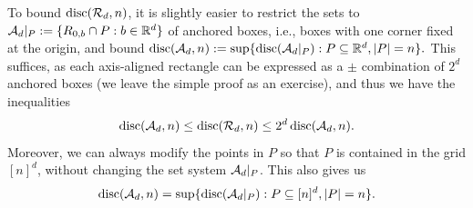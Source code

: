 To bound \(\disc(\RR_d, n)\), it is slightly easier to restrict the sets to 
\(
\AA_d|_P \eqdef \{\rbox_{0,b} \cap P: b \in \R^d\}
\)
of anchored boxes, i.e., boxes with one corner fixed at the origin, and bound
\(
\disc(\AA_d, n) \eqdef \sup\{\disc(\AA_d|_P): P \subseteq \R^d, |P| = n\}.
\)
This suffices, as each axis-aligned rectangle can be expressed as a $\pm$ combination of $2^d$ anchored boxes (we leave the simple proof as an exercise), and thus
  we have the inequalities
  \[
  \disc(\AA_d,n)  \le 
  \disc(\RR_d, n) \le 2^d \disc(\AA_d,n).
  \]
Moreover, we can always modify the points in $P$ so that $P$ is contained in the grid $[n]^d$, without changing the set system $\AA_d|_P$. This also gives us
   \[
     \disc(\AA_d, n) =
     \sup\{\disc(\AA_d|_P): P \subseteq [n]^d, |P| = n\}.
   \]
